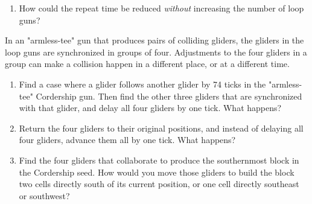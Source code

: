 \begin{multicols}{2}
\begin{problem}
\begin{enumerate}[label=\bf\color{ocre}(\alph*)]
			\item How could the repeat time be reduced \emph{without} increasing the number of loop guns?
		\end{enumerate}
	\end{problem}
	
	
	\mfilbreak
	
	
	\begin{problem}\label{exer:slow_glider_pairs}
		In an "armless-tee" gun that produces pairs of colliding gliders, the gliders in the loop guns are synchronized in groups of four. Adjustments to the four gliders in a group can make a collision happen in a different place, or at a different time.
		\begin{enumerate}[label=\bf\color{ocre}(\alph*)]
			\item Find a case where a glider follows another glider by 74 ticks in the "armless-tee" Cordership gun. Then find the other three gliders that are synchronized with that glider, and delay all four gliders by one tick. What happens?
			\item Return the four gliders to their original positions, and instead of delaying all four gliders, advance them all by one tick.  What happens?
			\item Find the four gliders that collaborate to produce the southernmost block in the Cordership seed. How would you move those gliders to build the block two cells directly south of its current position, or one cell directly southeast or southwest?
		\end{enumerate}
	\end{problem}
	

\end{multicols}
